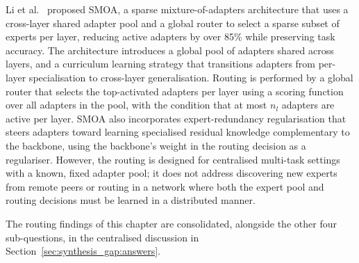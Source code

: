 Li et al.~\cite{LiZhouSparser2025} proposed SMOA, a sparse mixture-of-adapters architecture that
uses a cross-layer shared adapter pool and a global router to select a sparse subset of
experts per layer, reducing active adapters by over 85\% while preserving task accuracy.
The architecture introduces a global pool of adapters shared across layers, and a
curriculum learning strategy that transitions adapters from per-layer specialisation to
cross-layer generalisation. Routing is performed by a global router that selects the
top-activated adapters per layer using a scoring function over all adapters in the
pool, with the condition that at most $n_l$ adapters are active per layer. SMOA also
incorporates expert-redundancy regularisation that steers adapters toward learning
specialised residual knowledge complementary to the backbone, using the backbone's
weight in the routing decision as a regulariser. However, the routing is designed for
centralised multi-task settings with a known, fixed adapter pool; it does not address
discovering new experts from remote peers or routing in a network where both the expert
pool and routing decisions must be learned in a distributed manner.


\noindent The routing findings of this chapter are consolidated, alongside the
other four sub-questions, in the centralised discussion in
Section~\ref{sec:synthesis_gap:answers}.

